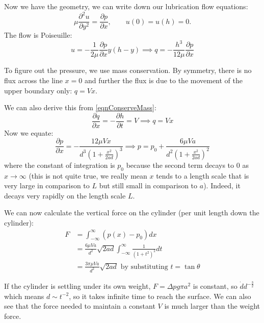 \documentclass[../Main.tex]{subfiles}
\begin{document}
Now we have the geometry, we can write down our lubrication flow equations:
\begin{equation*}
    \mu \frac{\partial^{2}u}{\partial y^{2}} = \frac{\partial p}{\partial x}, \qquad u(0) = u(h) = 0.
\end{equation*}
The flow is Poiseuille:
\begin{equation*}
    u = -\frac{1}{2\mu} \frac{\partial p}{\partial x} y(h-y) \implies q = -\frac{h^3}{12\mu} \frac{\partial p}{\partial x}
\end{equation*}

To figure out the pressure, we use mass conservation. By symmetry, there is no flux across the line $x = 0$ and further the flux is due to the movement of the upper boundary only: $q = Vx$.

We can also derive this from \ref{eqnConserveMass}:
\begin{equation*}
    \frac{\partial q}{\partial x} = - \frac{\partial h}{\partial t} = V \implies q = Vx
\end{equation*}
Now we equate:
\begin{equation*}
    \frac{\partial p}{\partial x} = -\frac{12\mu Vx}{d^3 \left(1 + \frac{x^2}{2ad}\right)^3} \implies p = p_0 + \frac{6\mu Va}{d^2\left(1 + \frac{x^2}{2ad}\right)^2}
\end{equation*}
where the constant of integration is $p_0$ because the second term decays to $0$ as $x \to \infty$ (this is not quite true, we really mean $x$ tends to a length scale that is very large in comparison to $L$ but still small in comparison to $a$). Indeed, it decays very rapidly on the length scale $L$.

We can now calculate the vertical force on the cylinder (per unit length down the cylinder):
\begin{align*}
    F &= \int_{-\infty}^{\infty} (p(x) - p_0) dx \\
    &= \frac{6\mu V a}{d^2} \sqrt{2ad} \int_{-\infty}^{\infty} \frac{1}{(1+t^2)^2} dt \\
    &= \frac{3\pi\mu V a}{d^2} \sqrt{2ad} \text{ by substituting $t = \tan \theta$}
\end{align*}

If the cylinder is settling under its own weight, $F = \Delta p g \pi a^2$ is constant, so $\dot{d} d^{-\frac32}$ which means $d \sim t^{-2}$, so it takes infinite time to reach the surface. We can also see that the force needed to maintain a constant $V$ is much larger than the weight force.
\end{document}
